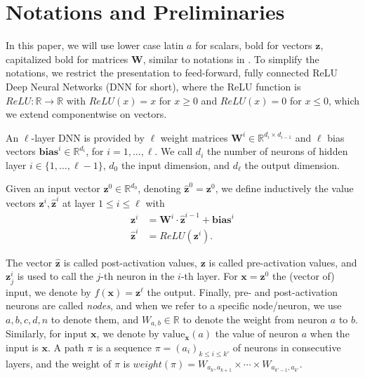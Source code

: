 \documentclass[a4paper,UKenglish,cleveref, autoref, thm-restate]{lipics-v2021}
\newcommand{\vz}{\boldsymbol{z}}
\newcommand{\vb}{\boldsymbol{bias}}
\newcommand{\val}{{\textrm{value}}}
\begin{document}
	
	
	
	
	\section{Notations and Preliminaries}
	
	In this paper, we will use lower case latin $a$ for scalars, bold for vectors $\boldsymbol{z}$, 
	capitalized bold for matrices $\boldsymbol{W}$, similar to notations in \cite{prima,crown}.
	To simplify the notations, we restrict the presentation to feed-forward, 
	fully connected ReLU Deep Neural Networks (DNN for short), where the ReLU function is $ReLU : \mathbb{R} \rightarrow \mathbb{R}$ with
	$ReLU(x)=x$ for $x \geq 0$ and $ReLU(x)=0$ for $x \leq 0$, which we extend componentwise on vectors.
	
	
	
	
	An $\ell$-layer DNN is provided by $\ell$ weight matrices 
	$\boldsymbol{W}^i \in \mathbb{R}^{d_i\times d_{i-1}}$
	and $\ell$ bias vectors $\vb^i \in \mathbb{R}^{d_i}$, for $i=1, \ldots, \ell$.
	We call $d_i$ the number of neurons of hidden layer $i \in \{1, \ldots, \ell-1\}$,
	$d_0$ the input dimension, and $d_\ell$ the output dimension.
	
	Given an input vector $\boldsymbol{z}^0 \in \mathbb{R}^{d_0}$, 
	denoting $\hat{\boldsymbol{z}}^{0}={\boldsymbol{z}}^0$, we define inductively the value vectors $\boldsymbol{z}^i,\hat{\vz}^i$ at layer $1 \leq i \leq \ell$ with
	\begin{align*}
		{\boldsymbol{z}}^{i} &= \boldsymbol{W}^i\cdot \hat{\boldsymbol{z}}^{i-1}+ \vb^i\\
		\hat{\boldsymbol{z}}^{i} &= ReLU({\boldsymbol{z}}^i).
	\end{align*} 
	
	The vector $\hat{\boldsymbol{z}}$ is called post-activation values, 
	$\boldsymbol{z}$ is called pre-activation values, 
	and $\boldsymbol{z}^{i}_j$ is used to call the $j$-th neuron in the $i$-th layer. 
	For $\boldsymbol{x}=\vz^0$ the (vector of) input, we denote by $f(\boldsymbol{x})=\vz^\ell$ the output. Finally, pre- and post-activation neurons are called \emph{nodes}, and when we refer to a specific node/neuron, we use $a,b,c,d,n$ to denote them, and $W_{a,b} \in \mathbb{R}$ to denote the weight from neuron $a$ to $b$. Similarly, for input $\boldsymbol{x}$, we denote by $\val_{\boldsymbol{x}}(a)$ the value of neuron $a$ when the input is $\boldsymbol{x}$. A path $\pi$ is a sequence $\pi=(a_i)_{k \leq  i \leq k'}$ of neurons in consecutive layers, and the weight of $\pi$ is 
	$weight(\pi)=W_{a_k,a_{k+1}} \times \cdots \times  W_{a_{k'-1},a_{k'}}$.
	
\end{document}
